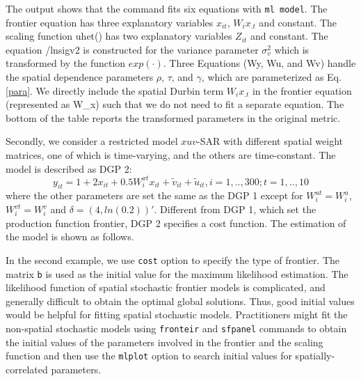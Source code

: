 \begin{stlog}
	
\end{stlog}

The output shows that the command fits six equations with {\tt ml model}. The frontier equation has three explanatory variables $x_{it}$, $W_ix_{.t}$ and constant. The scaling function uhet() has two explanatory variables $Z_{it}$ and constant.  The equation  /lnsigv2 is constructed for the variance parameter  $\sigma_v^2$ which is transformed by the function $exp(\cdot)$. Three Equations (Wy, Wu, and Wv) handle the spatial dependence parameters $\rho$, $\tau$, and $\gamma$, which are parameterized as Eq.\eqref{para}. We directly include the spatial Durbin term $W_ix_{.t}$ in the frontier equation  (represented as W\_x) such that we do not need to fit a separate equation.  The bottom of the table reports the transformed parameters in the original metric.

Secondly, we consider a restricted model $xuv$-SAR with different spatial weight matrices, one of which is time-varying, and the others are time-constant.  The model is described as DGP 2:
\begin{equation}\label{dgp2}
	y_{it} = 1+2x_{it}+ 0.5W_{i}^{xt}x_{it} + \tilde{v}_{it}+\tilde{u}_{it}, i=1,..,300; t=1,..,10
\end{equation}
where the other parameters are set the same as the DGP 1 except for $W_{i}^{ut}=W_{i}^u$, $W_{i}^{vt}=W_{i}^v$ and $\delta = (4,ln(0.2))'$.  Different from DGP 1, which set the production function frontier, DGP 2 specifies a cost function. The estimation of the model is shown as follows.

\begin{stlog}
	
\end{stlog}

In the second example, we use {\tt cost} option to specify the type of frontier.  The matrix {\tt b} is used as the initial value for the maximum likelihood estimation. The likelihood function of spatial stochastic frontier models is complicated, and generally difficult to obtain the optimal global solutions. Thus, good initial values would be helpful for fitting spatial stochastic models. Practitioners might fit the non-spatial stochastic models using  {\tt fronteir} and {\tt sfpanel} commands to obtain the initial values of the parameters involved in the frontier and the scaling function and then use the {\tt mlplot} option to search initial values for spatially-correlated parameters.
 
